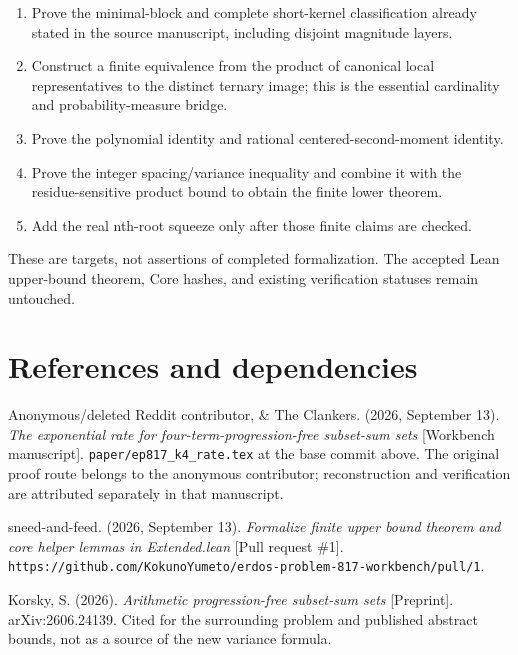 \begin{enumerate}
\def\labelenumi{\arabic{enumi}.}
\tightlist
\item
  Prove the minimal-block and complete short-kernel classification already stated in the source manuscript, including disjoint magnitude layers.
\item
  Construct a finite equivalence from the product of canonical local representatives to the distinct ternary image; this is the essential cardinality and probability-measure bridge.
\item
  Prove the polynomial identity and rational centered-second-moment identity.
\item
  Prove the integer spacing/variance inequality and combine it with the residue-sensitive product bound to obtain the finite lower theorem.
\item
  Add the real nth-root squeeze only after those finite claims are checked.
\end{enumerate}

These are targets, not assertions of completed formalization. The accepted Lean upper-bound theorem, Core hashes, and existing verification statuses remain untouched.

\section{References and dependencies}\label{n01-references-and-dependencies}

Anonymous/deleted Reddit contributor, \& The Clankers. (2026, September 13). \emph{The exponential rate for four-term-progression-free subset-sum sets} {[}Workbench manuscript{]}. \texttt{paper/ep817\_k4\_rate.tex} at the base commit above. The original proof route belongs to the anonymous contributor; reconstruction and verification are attributed separately in that manuscript.

sneed-and-feed. (2026, September 13). \emph{Formalize finite upper bound theorem and core helper lemmas in Extended.lean} {[}Pull request \#1{]}. \nolinkurl{https://github.com/KokunoYumeto/erdos-problem-817-workbench/pull/1}.

Korsky, S. (2026). \emph{Arithmetic progression-free subset-sum sets} {[}Preprint{]}. arXiv:2606.24139. Cited for the surrounding problem and published abstract bounds, not as a source of the new variance formula.
